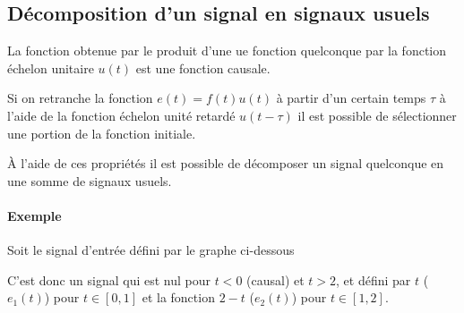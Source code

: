 \subsection{Décomposition d'un signal en signaux usuels}
La fonction obtenue par le produit d'une ue fonction quelconque 
par la fonction échelon unitaire $u(t)$ est une fonction causale.
\begin{center}
    
\end{center}
Si on retranche la fonction $e(t)=f(t)u(t)$ à partir d'un certain temps
$\tau$ à l'aide de la fonction échelon unité retardé $u(t-\tau)$ 
il est possible de sélectionner une portion de la fonction initiale.
\begin{center}
    
\end{center}
\`A l'aide de ces propriétés il est possible de décomposer un signal 
quelconque en une somme de signaux usuels.
\paragraph{Exemple}
Soit le signal d'entrée défini par le graphe ci-dessous
\begin{center}
    
\end{center}
C'est donc un signal qui est nul pour $t<0$ (causal) et $t>2$, et défini
par $t$ ($e_1(t)$) pour $t\in[0,1]$ et la fonction $2-t$ ($e_2(t)$) pour 
$t\in[1,2]$. 


